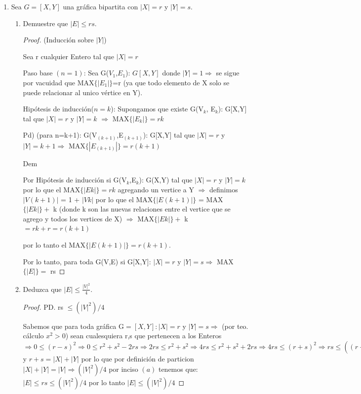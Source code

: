 \documentclass{article}
\begin{document}
\begin{enumerate}
\item Sea $G = [X, Y]$ una gr\'afica bipartita con $|X| = r$ y $|Y| = s$.
  \begin{enumerate}
  \item Demuestre que $|E| \le rs$.
    \begin{proof}
      (Inducción sobre $|Y|$) 
      
      Sea r cualquier Entero tal que $|X|=r$
      
      Paso base $(n = 1)$: Sea G($V_1$,$E_1$): $G[X,Y]$ donde $|Y|=1\Longrightarrow$  se
      sigue por vacuidad que MAX$\{|E_1|\}$=r (ya que todo elemento de X solo se puede relacionar al unico vértice  en Y). 
      
      Hipótesis de inducción($ n = k$): Supongamos que existe G(V$_k$, E$_k$): G[X,Y] tal que
      $|X|=r$ y $|Y|= k$ $\Longrightarrow$ MAX$\{|E_k|\} = rk$
      
      Pd) (para n=k+1): G(V$_{(k+1)}$,E$_{(k+1)}$): G[X,Y] tal que $|X|=r$ y $|Y|=k+1 \Longrightarrow$ 
      MAX$\{|E_{(k+1)}|\} = r(k+1)$
      
      Dem
      
      Por Hipótesis de inducción si G(V$_k$,E$_k$): G(X,Y) tal que $|X|=r$ y $|Y|=k$ por lo que 
      el MAX$\{|Ek|\}=rk $ agregando un vertice a Y $\Longrightarrow$ definimos $|V(k+1)|$ = 1 +
      $|Vk|$ por lo que el MAX$\{|E(k+1)|\}$ = MAX$\{|Ek|\} + $ k (donde k son las nuevas relaciones
      entre el vertice que se agrego y todos los vertices de X) $\Longrightarrow$ MAX$\{|Ek|\} + $ k
      $= rk +r = r(k+1)$
      
      por lo tanto el MAX$\{|E(k+1)|\} = r(k+1)$.
      
      Por lo tanto, para toda G(V,E) si G[X,Y]: $|X|=r$ y $|Y|=s \Longrightarrow$ MAX$\{|E|\} =$ rs
    \end{proof}
  \item Deduzca que $|E| \le \frac{|V|^2}{4}$.
    \begin{proof}
      PD. rs $ \leqslant (|V|^2)/4$
      
      Sabemos que para toda gráfica G$=[X,Y]: |X|=r$ y $|Y|=s \Longrightarrow$ (por teo. cálculo $x^2 > 0$)
      sean cualesquiera r,s que pertenecen a los Enteros  $\Longrightarrow  0 \leqslant (r-s)^2  \Longrightarrow
      0   \leqslant r^2 + s^2 -2rs \Longrightarrow 2rs \leqslant r^2 + s^2 \Longrightarrow 4rs \leqslant r^2 +
      s^2 + 2rs \Longrightarrow 4rs \leqslant (r+s)^2 \Longrightarrow rs \leqslant ((r+s)^2)/4 $ y $r+s = |X|+|Y|$
      por lo que por definición de particion $|X| + |Y| = |V|  \Longrightarrow (|V|^2)/4$ por inciso $(a)$
      tenemos que:  $|E|\leqslant rs \leqslant (|V|^2)/4$ por lo tanto $ |E|\leqslant (|V|^2)/4 $ 
      

\end{proof}
\end{enumerate}
\end{enumerate}
\end{document}
